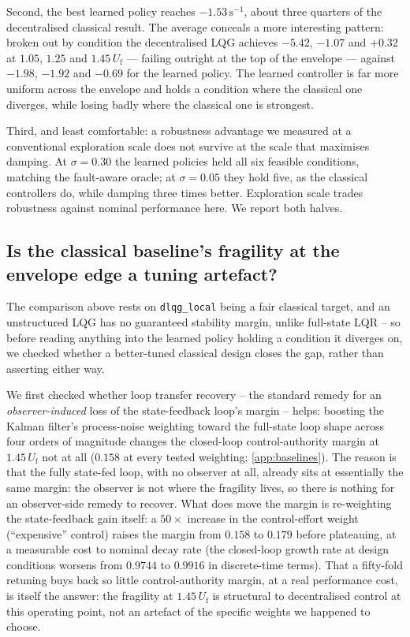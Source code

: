 \documentclass[preprint,11pt,authoryear]{elsarticle}
\newcommand{\Uf}{U_{\mathrm{f}}}
\begin{document}
Second, the best learned policy reaches $-1.53\,\mathrm{s}^{-1}$, about three
quarters of the decentralised classical result. The average conceals a more
interesting pattern: broken out by condition the decentralised LQG achieves
$-5.42$, $-1.07$ and $+0.32$ at $1.05$, $1.25$ and $1.45\,\Uf$ --- failing
outright at the top of the envelope --- against $-1.98$, $-1.92$ and $-0.69$ for
the learned policy. The learned controller is far more uniform across the
envelope and holds a condition where the classical one diverges, while losing
badly where the classical one is strongest.

Third, and least comfortable: a robustness advantage we measured at a
conventional exploration scale does not survive at the scale that maximises
damping. At $\sigma=0.30$ the learned policies held all six feasible conditions,
matching the fault-aware oracle; at $\sigma=0.05$ they hold five, as the
classical controllers do, while damping three times better. Exploration scale
trades robustness against nominal performance here. We report both halves.

\subsection{Is the classical baseline's fragility at the envelope edge a tuning artefact?}
\label{sec:robust-baseline}

The comparison above rests on \texttt{dlqg\_local} being a fair classical
target, and an unstructured LQG has no guaranteed stability margin, unlike
full-state LQR \citep{doyle1978guaranteed} -- so before reading anything into the
learned policy holding a condition it diverges on, we checked whether a
better-tuned classical design closes the gap, rather than asserting either
way.

We first checked whether loop transfer recovery \citep{doylestein1981ltr} --
the standard remedy for an \emph{observer-induced} loss of the state-feedback
loop's margin -- helps: boosting the Kalman filter's process-noise weighting
toward the full-state loop shape across four orders of magnitude changes the
closed-loop control-authority margin at $1.45\,\Uf$ not at all
($0.158$ at every tested weighting; \ref{app:baselines}). The reason is
that the fully state-fed loop, with no observer at all, already sits at
essentially the same margin: the observer is not where the fragility lives, so
there is nothing for an observer-side remedy to recover. What does move the
margin is re-weighting the state-feedback gain itself: a $50\times$ increase
in the control-effort weight (``expensive'' control) raises the margin from
$0.158$ to $0.179$ before plateauing, at a measurable cost to nominal decay
rate (the closed-loop growth rate at design conditions worsens from
$0.9744$ to $0.9916$ in discrete-time terms). That a fifty-fold retuning buys
back so little control-authority margin, at a real performance cost, is itself
the answer: the fragility at $1.45\,\Uf$ is structural to decentralised
control at this operating point, not an artefact of the specific weights we
happened to choose.
\end{document}
